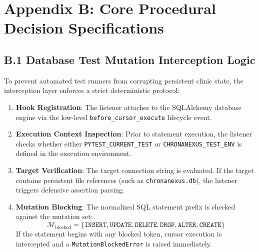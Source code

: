 \section{Appendix B: Core Procedural Decision Specifications}
\label{sec:app_core_algorithms}

\subsection{B.1 Database Test Mutation Interception Logic}
To prevent automated test runners from corrupting persistent clinic state, the interception layer enforces a strict deterministic protocol:
\begin{enumerate}
    \item \textbf{Hook Registration}: The listener attaches to the SQLAlchemy database engine via the low-level \texttt{before\_cursor\_execute} lifecycle event.
    \item \textbf{Execution Context Inspection}: Prior to statement execution, the listener checks whether either \texttt{PYTEST\_CURRENT\_TEST} or \texttt{CHRONANEXUS\_TEST\_ENV} is defined in the execution environment.
    \item \textbf{Target Verification}: The target connection string is evaluated. If the target contains persistent file references (such as \texttt{chronanexus.db}), the listener triggers defensive assertion parsing.
    \item \textbf{Mutation Blocking}: The normalized SQL statement prefix is checked against the mutation set:
    \begin{equation}
        \mathcal{M}_{\text{blocked}} = \{\texttt{INSERT}, \texttt{UPDATE}, \texttt{DELETE}, \texttt{DROP}, \texttt{ALTER}, \texttt{CREATE}\}
    \end{equation}
    If the statement begins with any blocked token, cursor execution is intercepted and a \texttt{MutationBlockedError} is raised immediately.
\end{enumerate}

